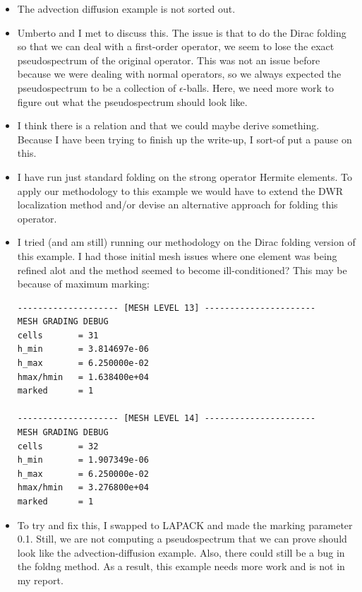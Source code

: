 \documentclass[12pt,a4paper]{article}
\begin{document}
\begin{itemize}
    \item The advection diffusion example is not sorted out.
    \item Umberto and I met to discuss this. The issue is that to do the Dirac folding so that we can deal with a first-order operator, we seem to lose the exact pseudospectrum of the original operator. This was not an issue before because we were dealing with normal operators, so we always expected the pseudospectrum to be a collection of $\epsilon$-balls. Here, we need more work to figure out what the pseudospectrum should look like. 
    \item I think there is a relation and that we could maybe derive something. Because I have been trying to finish up the write-up, I sort-of put a pause on this. 
    \item I have run just standard folding on the strong operator Hermite elements. To apply our methodology to this example we would have to extend the DWR localization method and/or devise an alternative approach for folding this operator. 
    \item I tried (and am still) running our methodology on the Dirac folding version of this example. I had those initial mesh issues where one element was being refined alot and the method seemed to become ill-conditioned? This may be because of maximum marking:

\begin{lstlisting}
-------------------- [MESH LEVEL 13] ----------------------
MESH GRADING DEBUG
cells       = 31
h_min       = 3.814697e-06
h_max       = 6.250000e-02
hmax/hmin   = 1.638400e+04
marked      = 1

-------------------- [MESH LEVEL 14] ----------------------
MESH GRADING DEBUG
cells       = 32
h_min       = 1.907349e-06
h_max       = 6.250000e-02
hmax/hmin   = 3.276800e+04
marked      = 1
\end{lstlisting}
\item To try and fix this, I swapped to LAPACK and made the marking parameter 0.1. Still, we are not computing a pseudospectrum that we can prove should look like the advection-diffusion example. Also, there could still be a bug in the foldng method. As a result, this example needs more work and is not in my report. 
\end{itemize}



\end{document}
